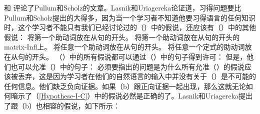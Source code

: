  \citet{LU2002a}和 \citet{LY2002a}评论了Pullum和Scholz的文章。Lasnik和Uriagereka论证道，习得问题要比Pullum和Scholz提出的大得多，因为当一个学习者不知道他要习得语言的任何知识时，这个学习者不能只有我们已经讨论过的（）中的假说，还应该有（）中的其他假说：
\eal
\label{Hilfsverbhypothesen}
\ex 将第一个助动词放在从句的开头。
\ex\label{Hypothese-I-C} 
将第一个助动词放在从句的开头的matrix-Infl上。
\zl
\eal
\ex 将任意一个助动词放在从句的开头。
\ex 将任意一个定式的助动词放在从句的开头。
\zl
（）中的所有假说都可以通过（）中的句子得到许可：
\eal
{}
\zl
但是，他们也可以允准（）中的句子：
\z
必须要指出的问题是为什么所有允准（）的假说应该被丢弃，这是因为学习者在他们的自然语言的输入中并没有关于（）是不可能的任何信息。他们缺乏负向证据。如果（b）跟正向证据一起出现，那么这就无论如何暗示了（\ref{Hypothese-I-C}）中的假说必然是正确的了。Lasnik和Uriagereka提出了跟（b）也相容的假说，如下所示：
